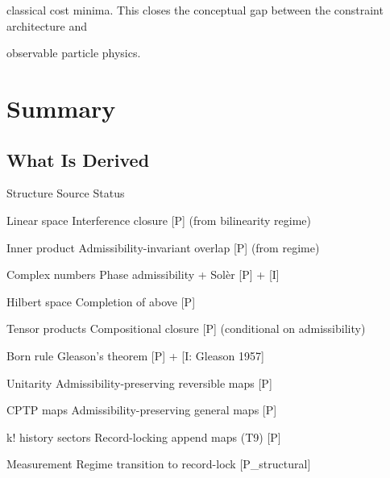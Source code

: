 \documentclass[11pt]{article}
\begin{document}
classical cost minima. This closes the conceptual gap between the constraint architecture and

observable particle physics.



\section{Summary}



\subsection{What Is Derived}



Structure                    Source                                     Status



Linear space                 Interference closure                       [P] (from bilinearity regime)



Inner product                Admissibility-invariant overlap            [P] (from regime)



Complex numbers              Phase admissibility + Solèr                [P] + [I]



Hilbert space                Completion of above                        [P]



Tensor products              Compositional closure                      [P] (conditional on admissibility)



Born rule                    Gleason’s theorem                          [P] + [I: Gleason 1957]



Unitarity                    Admissibility-preserving reversible maps [P]



CPTP maps                    Admissibility-preserving general maps      [P]



k! history sectors           Record-locking append maps (T9)            [P]



Measurement                  Regime transition to record-lock           [P_structural]
\end{document}
